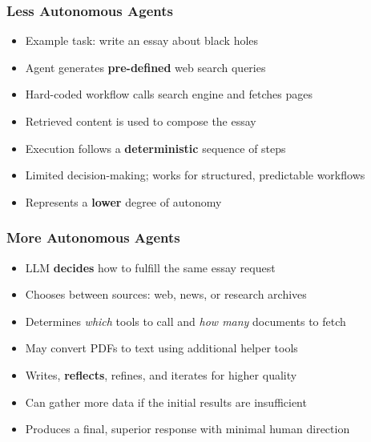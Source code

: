 \begin{frame}[fragile]\frametitle{Less Autonomous Agents}
      \begin{itemize}
        \item Example task: write an essay about black holes
        \item Agent generates \textbf{pre-defined} web search queries
        \item Hard-coded workflow calls search engine and fetches pages
        \item Retrieved content is used to compose the essay
        \item Execution follows a \textbf{deterministic} sequence of steps
        \item Limited decision-making; works for structured, predictable workflows
        \item Represents a \textbf{lower} degree of autonomy
      \end{itemize}
\end{frame}

\begin{frame}[fragile]\frametitle{More Autonomous Agents}
      \begin{itemize}
        \item LLM \textbf{decides} how to fulfill the same essay request
        \item Chooses between sources: web, news, or research archives
        \item Determines \emph{which} tools to call and \emph{how many} documents to fetch
        \item May convert PDFs to text using additional helper tools
        \item Writes, \textbf{reflects}, refines, and iterates for higher quality
        \item Can gather more data if the initial results are insufficient
        \item Produces a final, superior response with minimal human direction
      \end{itemize}
\end{frame}


